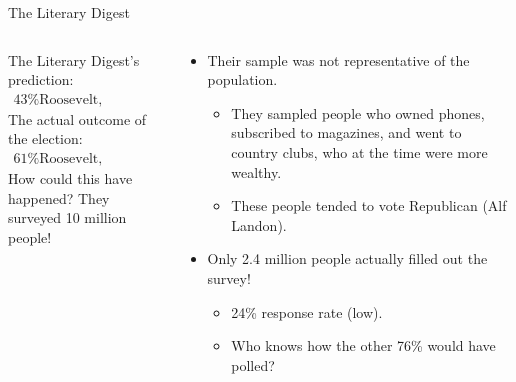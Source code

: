 \documentclass[aspectratio=169]{../latex_main/tntbeamer}  %
\begin{document}
	
	\begin{frame}{The Literary Digest}
	    \begin{columns}
	        \begin{column}{.4\textwidth}
	            \bigskip


	            The Literary Digest’s \alert{prediction}:
                \begin{align*}
                    \text{43\% Roosevelt, 57\% Landon}
                \end{align*}
                The \alert{actual outcome} of the election:
                \begin{align*}
                    \text{61\% Roosevelt, 37\% Landon}
                \end{align*}
                How could this have happened? They surveyed 10 million people!
	        \end{column}
	        
	        \begin{column}{.5\textwidth}
	            \begin{itemize}
	                \item Their sample was not representative of the population.
	                \begin{itemize}
	                    \item They sampled people who owned phones, subscribed to magazines, and went to country clubs, who at the time were more wealthy.
	                    \item These people tended to vote Republican (Alf Landon).
	                \end{itemize}
	                \item Only 2.4 million people actually filled out the survey!
	                \begin{itemize}
	                    \item 24\% response rate (low).
	                    \item Who knows how the other 76\% would have polled?
	                \end{itemize}
	            \end{itemize}
	        \end{column}
	        
	    \end{columns}
	    
	\end{frame}
	
\end{document}
